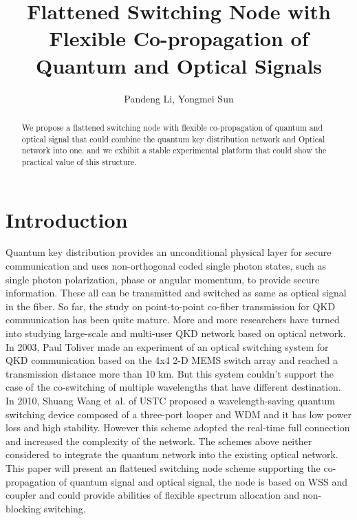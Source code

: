 \documentclass[letterpaper,10pt]{article}
\begin{document}
\title{Flattened Switching Node with Flexible Co-propagation of Quantum and Optical Signals}
\author{Pandeng Li, Yongmei Sun}
\address{State Key Laboratory of Information Photonics and Optical Communications, School of Information and Telecommunication Engineering, BUPT Beijing, China, 100876}
\begin{abstract}
\noindent We propose a flattened switching node with flexible co-propagation of quantum and optical signal that could combine the quantum key distribution network and Optical network into one. and we exhibit a stable experimental platform that could show the practical value of this structure.
\end{abstract}

\section{Introduction}
Quantum key distribution provides an unconditional physical layer for secure communication\cite{ToliverPaul} and uses non-orthogonal coded single photon states, such as single photon polarization, phase or angular momentum, to provide secure information. These all can be transmitted and switched as same as optical signal in the fiber. So far, the study on point-to-point co-fiber transmission for QKD communication has been quite mature. More and more researchers have turned into studying large-scale and multi-user QKD network based on optical network. In 2003, Paul Toliver made an experiment of an optical switching system for QKD communication based on the 4x4 2-D MEMS switch array and reached a transmission distance more than 10 km\cite{ToliverPaul}. But this system couldn't support the case of the co-switching of multiple wavelengths that have different destination. In 2010, Shuang Wang et al. of USTC proposed a wavelength-saving quantum switching device composed of a three-port looper and WDM\cite{WangShuang} and it has low power loss and high stability.  However this scheme adopted the real-time full connection and increased the complexity of the network. The schemes above neither considered to integrate the quantum network into the existing optical network. This paper will present an flattened switching node scheme supporting the co-propagation of quantum signal and optical signal, the node is based on WSS and coupler and could provide abilities of flexible spectrum allocation and non-blocking switching.
\end{document}
